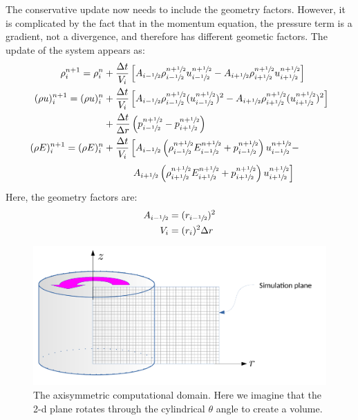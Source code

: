The conservative update now needs to include the geometry factors.  However,
it is complicated by the fact that in the momentum equation, the pressure 
term is a gradient, not a divergence, and therefore has different 
geometic factors.  The update of the system appears as:
\begin{align}
\rho^{n+1}_i = \rho^n_i &+ \frac{\Delta t}{V_i} 
   \left [A_{i-\myhalf} \rho_{i-\myhalf}^{n+\myhalf} u_{i-\myhalf}^{n+\myhalf} - 
          A_{i+\myhalf} \rho_{i+\myhalf}^{n+\myhalf} u_{i+\myhalf}^{n+\myhalf} \right ] \\
(\rho u)^{n+1}_i = (\rho u)^n_i &+ \frac{\Delta t}{V_i} 
   \left [ A_{i-\myhalf} \rho_{i-\myhalf}^{n+\myhalf} (u_{i-\myhalf}^{n+\myhalf})^2  - 
           A_{i+\myhalf} \rho_{i+\myhalf}^{n+\myhalf} (u_{i+\myhalf}^{n+\myhalf})^2  \right ]\nonumber \\
        & + \frac{\Delta t}{\Delta r} \left ( p_{i-\myhalf}^{n+\myhalf} - 
                                              p_{i+\myhalf}^{n+\myhalf} \right ) \\
(\rho E)^{n+1}_i = (\rho E)^n_i &+ \frac{\Delta t}{V_i} 
   \left [ A_{i-\myhalf} \left (\rho_{i-\myhalf}^{n+\myhalf} E_{i-\myhalf}^{n+\myhalf}  + p_{i-\myhalf}^{n+\myhalf} \right ) u_{i-\myhalf}^{n+\myhalf} - \right . \nonumber \\
   &\phantom{+ \frac{\Delta t}{V_i} \left[ \right.}   \left .   A_{i+\myhalf} \left (\rho_{i+\myhalf}^{n+\myhalf} E_{i+\myhalf}^{n+\myhalf}  + p_{i+\myhalf}^{n+\myhalf} \right ) u_{i+\myhalf}^{n+\myhalf} \right ]
\end{align}
Here, the geometry factors are:
\begin{align}
A_{i-{\sfrac{1}{2}}} &= (r_{i-{\sfrac{1}{2}}})^2\\
V_i &= (r_i)^2 \Delta r
\end{align}

\begin{figure}
\centering
\includegraphics[width=0.8\linewidth]{axisymmetry}
\caption[The axisymmetric computational domain]
{\label{fig:axisymmetri} The axisymmetric computational domain.  Here we
  imagine that the 2-d plane rotates through the cylindrical $\theta$ angle to
  create a volume.}
\end{figure}

